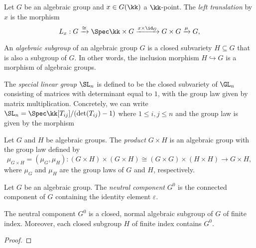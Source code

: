     \begin{definition}\label{def:transition_morphism}
        Let \(G\) be an algebraic group and \(x \in G(\kk)\) a \(\kk\)-point.
        The \emph{left translation} by \(x\) is the morphism
        \[
            L_x: G \xrightarrow{\cong} \Spec \kk \times G \xrightarrow{x \times \id_G} G \times G \xrightarrow{\mu} G,
        \]
    \end{definition}

    \begin{definition}\label{def:algebraic_subgroup}
        An \emph{algebraic subgroup} of an algebraic group \(G\) is a closed subvariety \(H \subseteq G\) that is also a subgroup of \(G\).
        In other words, the inclusion morphism \(H \hookrightarrow G\) is a morphism of algebraic groups.
    \end{definition}

    \begin{example}\label{eg:special_linear_group}
        The \emph{special linear group} $\SL_n$ is defined to be the closed subvariety of $\GL_n$ consisting of matrices with determinant equal to \(1\), with the group law given by matrix multiplication.
        Concretely, we can write \(\SL_n = \Spec \kk[T_{ij}]/(\det(T_{ij}) - 1)\) where \(1 \leq i,j \leq n\) and the group law is given by the morphism
    \end{example}

    \begin{definition}\label{def:product_of_algebraic_groups}
        Let \(G\) and \(H\) be algebraic groups.
        The \emph{product} \(G \times H\) is an algebraic group with the group law defined by
        \[
            \mu_{G \times H} = (\mu_G, \mu_H): (G \times H) \times (G \times H) \cong (G \times G) \times (H \times H) \to G \times H,
        \]
        where \(\mu_G\) and \(\mu_H\) are the group laws of \(G\) and \(H\), respectively.
    \end{definition}

    \begin{definition}\label{def:neutral_component}
        Let \(G\) be an algebraic group.
        The \emph{neutral component} \(G^0\) is the connected component of \(G\) containing the identity element \(\varepsilon\).
    \end{definition}

    \begin{proposition}\label{prop:neutral_component_is_subgroup}
        The neutral component \(G^0\) is a closed, normal algebraic subgroup of \(G\) of finite index.
        Moreover, each closed subgroup \(H\) of finite index contains \(G^0\).
    \end{proposition}
    \begin{proof}
    \end{proof}

